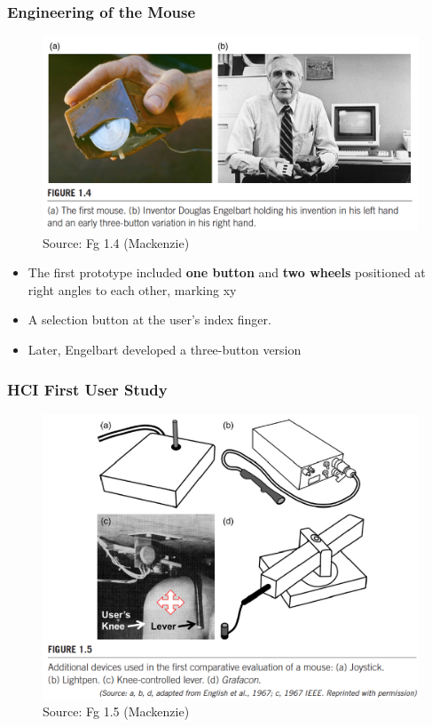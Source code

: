 \documentclass{beamer}
\begin{document}
\begin{frame}
\frametitle{Engineering of the Mouse}
\centering
\begin{figure}
	\includegraphics[width=0.65\linewidth]{mouse}
	\caption{Source: Fg 1.4 (Mackenzie)}
\end{figure}
\vspace{-10pt}
\begin{itemize}
	\item The first prototype included \textbf{one button} and \textbf{two wheels} positioned at right angles to each other, marking xy
	\item A selection button at the user's index finger.
	\item Later, Engelbart developed a three-button version
\end{itemize}
\end{frame}

\begin{frame}
\frametitle{HCI First User Study}
\centering
\begin{figure}
	\includegraphics[width=0.6\linewidth]{user-study}
	\caption{Source: Fg 1.5 (Mackenzie)}
\end{figure}
\end{frame}
\end{document}

